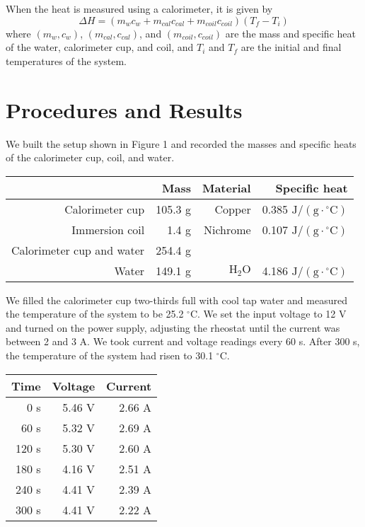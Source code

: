 \documentclass[11pt, titlepage, letterpaper, twoside]{article}
\begin{document}
When the heat is measured using a calorimeter, it is given by\nopagebreak
\begin{equation}
  \Delta H = (m_wc_w + m_{cal}c_{cal} + m_{coil}c_{coil})(T_f - T_i)
\end{equation}
\nopagebreak \noindent where $(m_w, c_w)$, $(m_{cal}, c_{cal})$, and $(m_{coil}, c_{coil})$ are the mass and specific heat of the water, calorimeter cup, and coil, and $T_i$ and $T_f$
are the initial and final temperatures of the system.


\section{Procedures and Results}

We built the setup shown in Figure 1 and recorded the masses and specific heats of the calorimeter cup, coil, and water.

\newcommand{\degC}{$^\circ\mathrm{C}$}
\newcommand{\JgK}{$\mathrm{J / (g \cdot {^\circ\mathrm{C}}) }$}
\newcommand{\water}{$\mathrm{H_2O}$}

\begin{center}
\begin{tabular}{| r | r | r | r |}
  \hline
                  & Mass    & Material & Specific heat \\ \hline
  Calorimeter cup & 105.3 g & Copper   & 0.385 \JgK    \\ \hline
  Immersion coil  & 1.4 g   & Nichrome & 0.107 \JgK    \\ \hline
  Calorimeter cup
  and water       & 254.4 g &          &               \\ \hline
  Water           & 149.1 g & \water   & 4.186 \JgK    \\ \hline
\end{tabular}
\end{center}

We filled the calorimeter cup two-thirds full with cool tap water and measured the temperature of the system to be 25.2 \degC. We set the input voltage to 12 V
and turned on the power supply, adjusting the rheostat until the current was between 2 and 3 A. We took current and voltage readings every 60 s. After 300 s,
the temperature of the system had risen to 30.1 \degC.

\begin{center}
\begin{tabular}{| r | r | r |}
  \hline
  Time  & Voltage & Current \\ \hline
  0 s   & 5.46 V  & 2.66 A  \\ \hline
  60 s  & 5.32 V  & 2.69 A  \\ \hline
  120 s & 5.30 V  & 2.60 A  \\ \hline
  180 s & 4.16 V  & 2.51 A  \\ \hline
  240 s & 4.41 V  & 2.39 A  \\ \hline
  300 s & 4.41 V  & 2.22 A  \\ \hline
\end{tabular}
\end{center}
\end{document}
